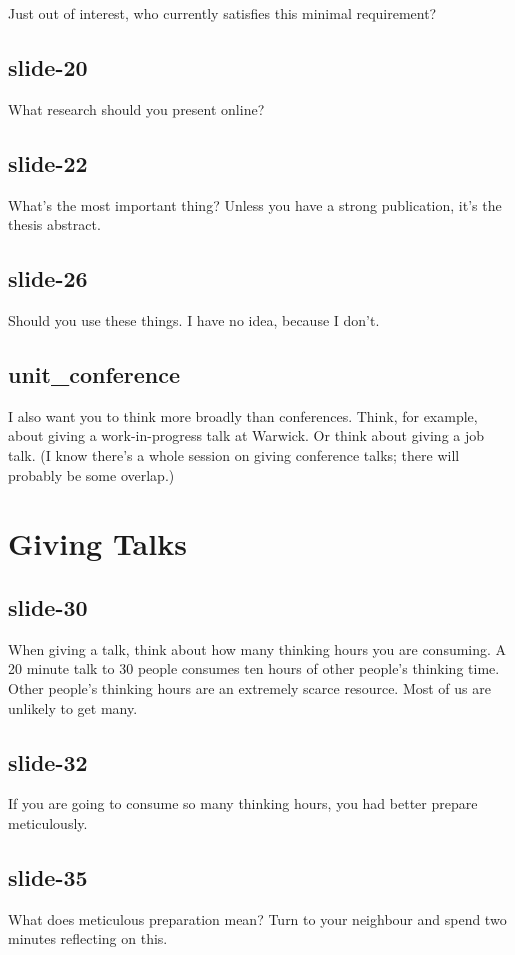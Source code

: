 \documentclass[12pt,\papersize]{extarticle}
\begin{document}
Just out of interest, who currently satisfies this minimal requirement?
 
\subsection{slide-20}
What research should you present online?
 
\subsection{slide-22}
What's the most important thing?  Unless you have a strong publication, it's the thesis abstract.
 
\subsection{slide-26}
Should you use these things.  I have no idea, because I don't.
 
\subsection{unit\_conference}
I also want you to think more broadly than conferences.  Think, for example, about giving a work-in-progress talk at Warwick.  Or think about giving a job talk.  (I know there's a whole session on giving conference talks; there will probably be some overlap.)
 
 
 
\section{Giving Talks}
 
\subsection{slide-30}
When giving a talk, think about how many thinking hours you are consuming.
A 20 minute talk to 30 people consumes ten hours of other people's thinking time.
Other people's thinking hours are an extremely scarce resource.
Most of us are unlikely to get many.
 
\subsection{slide-32}
If you are going to consume so many thinking hours, you had better prepare meticulously.
 
\subsection{slide-35}
What does meticulous preparation mean?
Turn to your neighbour and spend two minutes reflecting on this.
 
\end{document}
